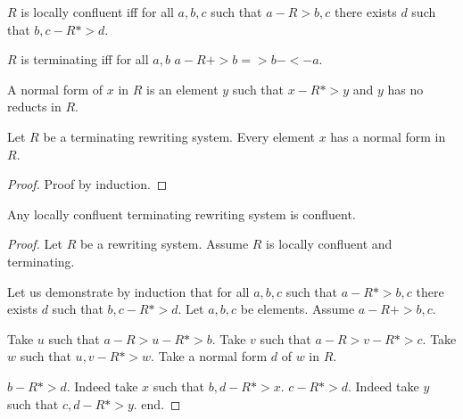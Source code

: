 \documentclass{article}
\begin{document}
\begin{forthel}
    \begin{definition}[WCRDef]
      $R$ is locally confluent iff for all $a,b,c$ such that $a -R> b,c$ there exists $d$ such that $b,c -R*> d$.
    \end{definition}

    \begin{definition}[Termin]
      $R$ is terminating iff for all $a,b$ $a -R+> b => b -<- a$.
    \end{definition}

    \begin{definition}[NFRDef]
      A normal form of $x$ in $R$ is an element $y$ such that $x -R*> y$ and $y$ has no reducts in $R$.
    \end{definition}

    \begin{lemma}[TermNF]
      Let $R$ be a terminating rewriting system. Every element $x$ has a normal form in $R$.
    \end{lemma}
    \begin{proof}
      Proof by induction.
    \end{proof}


    \begin{lemma}[Newman]
      Any locally confluent terminating rewriting system is confluent.
    \end{lemma}
    \begin{proof}
      Let $R$ be a rewriting system. Assume $R$ is locally confluent and
      terminating.

      Let us demonstrate by induction that for all $a,b,c$ such that $a -R*> b,c$ there exists $d$ such that $b,c -R*> d$.
        Let $a,b,c$ be elements. Assume $a -R+> b,c$.

        Take $u$ such that $a -R> u -R*> b$.
        Take $v$ such that $a -R> v -R*> c$.
        Take $w$ such that $u,v -R*> w$.
        Take a normal form $d$ of $w$ in $R$.

        $b -R*> d$. Indeed take $x$ such that $b,d -R*> x$. $c -R*> d$. Indeed take $y$ such that $c,d -R*> y$.
      end.
    \end{proof}
  \end{forthel}
\end{document}
